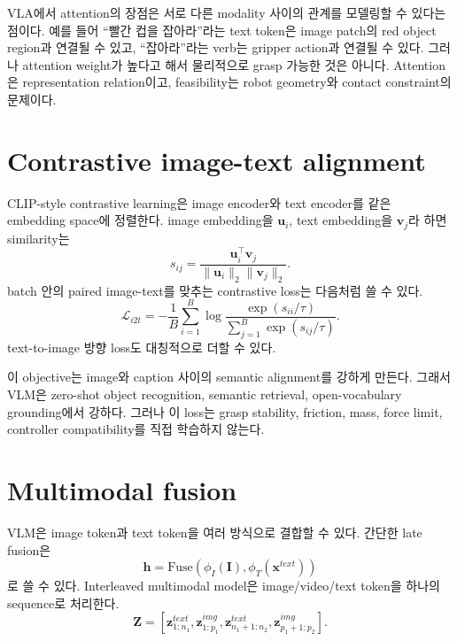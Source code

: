 VLA에서 attention의 장점은 서로 다른 modality 사이의 관계를 모델링할 수 있다는 점이다. 예를 들어 ``빨간 컵을 잡아라''라는 text token은 image patch의 red object region과 연결될 수 있고, ``잡아라''라는 verb는 gripper action과 연결될 수 있다. 그러나 attention weight가 높다고 해서 물리적으로 grasp 가능한 것은 아니다. Attention은 representation relation이고, feasibility는 robot geometry와 contact constraint의 문제이다.

\section{Contrastive image-text alignment}

CLIP-style contrastive learning은 image encoder와 text encoder를 같은 embedding space에 정렬한다. image embedding을 $\bm{u}_i$, text embedding을 $\bm{v}_j$라 하면 similarity는
\begin{equation}
  s_{ij}
  =
  \frac{\bm{u}_i^\top \bm{v}_j}
  {\|\bm{u}_i\|_2\|\bm{v}_j\|_2}.
  \label{eq:clip-similarity}
\end{equation}
batch 안의 paired image-text를 맞추는 contrastive loss는 다음처럼 쓸 수 있다.
\begin{equation}
  \mathcal{L}_{i2t}
  =
  -\frac{1}{B}
  \sum_{i=1}^{B}
  \log
  \frac{\exp(s_{ii}/\tau)}
  {\sum_{j=1}^{B}\exp(s_{ij}/\tau)}.
  \label{eq:clip-loss}
\end{equation}
text-to-image 방향 loss도 대칭적으로 더할 수 있다.

이 objective는 image와 caption 사이의 semantic alignment를 강하게 만든다. 그래서 VLM은 zero-shot object recognition, semantic retrieval, open-vocabulary grounding에서 강하다. 그러나 이 loss는 grasp stability, friction, mass, force limit, controller compatibility를 직접 학습하지 않는다.

\section{Multimodal fusion}

VLM은 image token과 text token을 여러 방식으로 결합할 수 있다. 간단한 late fusion은
\begin{equation}
  \bm{h}
  =
  \mathrm{Fuse}(\phi_I(\bm{I}),\phi_T(\bm{x}^{text}))
  \label{eq:late-fusion}
\end{equation}
로 쓸 수 있다. Interleaved multimodal model은 image/video/text token을 하나의 sequence로 처리한다.
\begin{equation}
  \bm{Z}
  =
  [\bm{z}^{text}_{1:n_1},\bm{z}^{img}_{1:p_1},\bm{z}^{text}_{n_1+1:n_2},\bm{z}^{img}_{p_1+1:p_2}].
  \label{eq:interleaved-sequence}
\end{equation}

